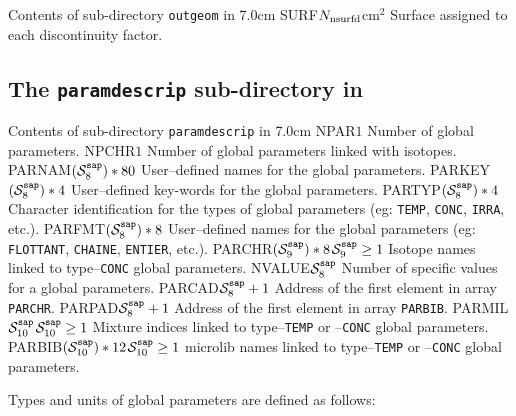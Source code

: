 \begin{DescriptionEnregistrement}{Contents of sub-directory {\tt outgeom} in }{7.0cm}
\RealEnr
  {SURF}{$N_{\rm nsurfd}$}{cm$^2$}
  {Surface assigned to each discontinuity factor.}
\end{DescriptionEnregistrement}

\subsection{The {\tt paramdescrip} sub-directory in }\label{sect:sapdirparam}

\vskip -0.5cm

\begin{DescriptionEnregistrement}{Contents of sub-directory {\tt paramdescrip} in }{7.0cm}
\IntEnr
  {NPAR}{$1$}
  {Number of global parameters.}
\IntEnr
  {NPCHR}{$1$}
  {Number of global parameters linked with isotopes.}
\CharEnr
  {PARNAM}{$(\mathcal{S}^{\tt sap}_8)*80$}
  {User--defined names for the global parameters.}
\CharEnr
  {PARKEY}{$(\mathcal{S}^{\tt sap}_8)*4$}
  {User--defined key-words for the global parameters.}
\CharEnr
  {PARTYP}{$(\mathcal{S}^{\tt sap}_8)*4$}
  {Character identification for the types of global parameters (eg: {\tt TEMP}, {\tt CONC}, {\tt IRRA}, etc.).}
\CharEnr
  {PARFMT}{$(\mathcal{S}^{\tt sap}_8)*8$}
  {User--defined names for the global parameters (eg: {\tt FLOTTANT}, {\tt CHAINE}, {\tt ENTIER}, etc.).}
\OptCharEnr
  {PARCHR}{$(\mathcal{S}^{\tt sap}_9)*8$}{$\mathcal{S}^{\tt sap}_9\ge 1$}
  {Isotope names linked to type--{\tt CONC} global parameters.}
\IntEnr
  {NVALUE}{$\mathcal{S}^{\tt sap}_8$}
  {Number of specific values for a global parameters.}
\IntEnr
  {PARCAD}{$\mathcal{S}^{\tt sap}_8+1$}
  {Address of the first element in array {\tt PARCHR}.}
\IntEnr
  {PARPAD}{$\mathcal{S}^{\tt sap}_8+1$}
  {Address of the first element in array {\tt PARBIB}.}
\OptIntEnr
  {PARMIL}{$\mathcal{S}^{\tt sap}_{10}$}{$\mathcal{S}^{\tt sap}_{10}\ge 1$}
  {Mixture indices linked to type--{\tt TEMP} or --{\tt CONC} global parameters.}
\OptCharEnr
  {PARBIB}{$(\mathcal{S}^{\tt sap}_{10})*12$}{$\mathcal{S}^{\tt sap}_{10}\ge 1$}
  {{\sc microlib} names linked to type--{\tt TEMP} or --{\tt CONC} global parameters.}
\end{DescriptionEnregistrement}
\goodbreak

Types and units of global parameters are defined as follows:

